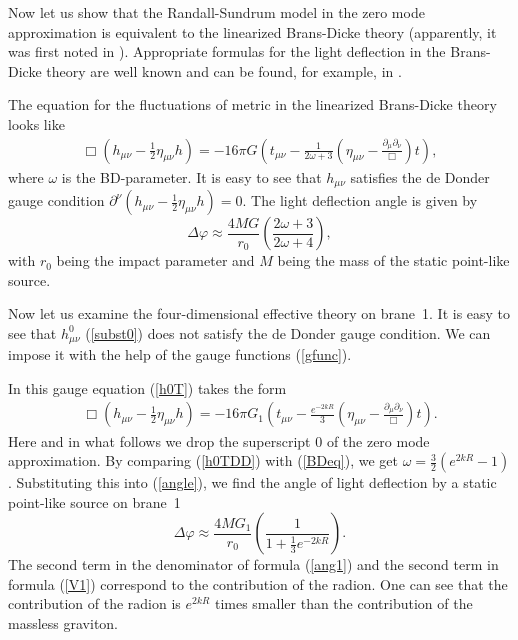 \documentclass[a4paper,12pt]{article}
\begin{document}
Now let us show that the Randall-Sundrum model in the zero mode
approximation is equivalent to the linearized Brans-Dicke theory
(apparently, it was first  noted in \cite{GarTan}). Appropriate
formulas for the light deflection in the Brans-Dicke theory are
well known and can be found, for example, in \cite{Weinberg}.

The equation for the fluctuations of metric in the linearized
Brans-Dicke theory  looks like
\begin{eqnarray}\label{BDeq}
\Box \left(h_{\mu\nu}-\frac{1}{2}\eta_{\mu\nu}h\right)=-16\pi G
\left(t_{\mu\nu}-\frac{1}{2\omega+3}\left(
\eta_{\mu\nu}-\frac{\partial_\mu\partial_\nu}{\Box}\right)t\right),
\end{eqnarray}
where $\omega$ is the BD-parameter. It is easy to see that
$h_{\mu\nu}$ satisfies the de Donder gauge condition
$\partial^{\nu}\left(h_{\mu\nu}-\frac{1}{2}\eta_{\mu\nu}h\right)=0$.
The light deflection angle is given by~\cite{Weinberg}
\begin{equation}\label{angle}
\Delta\varphi\approx\frac{4MG}{r_{0}}\left(\frac{2\omega+3}{2\omega+4}\right),
\end{equation}
with $r_{0}$ being the impact parameter and  $M$ being the mass of the
static point-like source.

Now let us examine the four-dimensional effective theory on
brane~1. It is easy to see that $h^{0}_{\mu\nu}$ (\ref{subst0})
does not satisfy the de Donder gauge condition. We can impose it
with the help of the gauge functions (\ref{gfunc}).

In this gauge equation (\ref{h0T}) takes the form
\begin{eqnarray}\label{h0TDD}
\Box \left(h_{\mu\nu}-\frac{1}{2}\eta_{\mu\nu}h\right)=-16\pi
G_{1}\left(t_{\mu\nu}-\frac{e^{-2kR}}{3}\left(\eta_{\mu\nu}-\frac{
\partial_\mu\partial_\nu}{\Box}\right)t\right).
\end{eqnarray}
Here and in what follows we drop the superscript $0$ of the zero
mode approximation. By comparing (\ref{h0TDD}) with (\ref{BDeq}),
we get $\omega = \frac{3}{2}\left(e^{2kR}-1\right) $. Substituting
this into (\ref{angle}), we find the angle of light deflection  by
a static  point-like source  on brane~1
\begin{equation}\label{ang1}
\Delta\varphi\approx\frac{4MG_{1}}{r_{0}}\left(\frac{1}{1+\frac{1}{3}e^{-2kR}}\right).
\end{equation}
The second term in the denominator of formula (\ref{ang1}) and the second
term in formula (\ref{V1}) correspond to the contribution of the
radion. One can see that the contribution of the radion is $e^{2kR}$
times smaller than  the contribution of the massless graviton.
\end{document}
